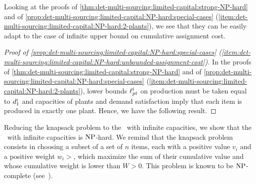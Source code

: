 Looking at the proofs of \cref{thm:det-multi-sourcing:limited-capital:strong-NP-hard} and of \cref{prop:det-multi-sourcing:limited-capital:NP-hard:special-cases} (\cref{item:det-multi-sourcing:limited-capital:NP-hard:2-plants}), we see that they can be easily adapt to the case of infinite upper bound on cumulative assignment cost.



\begin{proof}[Proof of \cref{prop:det-multi-sourcing:limited-capital:NP-hard:special-cases} (\cref{item:det-multi-sourcing:limited-capital:NP-hard:unbounded-assignment-cost})]
In the proofs of \cref{thm:det-multi-sourcing:limited-capital:strong-NP-hard} and of \cref{prop:det-multi-sourcing:limited-capital:NP-hard:special-cases} (\cref{item:det-multi-sourcing:limited-capital:NP-hard:2-plants}), lower bounds $\ell_{pt}^i$ on production must be taken equal to $d_1^i$ and capacities of plants and demand satisfaction imply that each item is produced in exactly one plant.
Hence, we have the following result.
\end{proof}







Reducing the knapsack problem to the \tbc\ with infinite capacities, we show that the \tbc\ with infinite capacities is $\operatorname{NP}$-hard.
We remind that the knapsack problem consists in choosing a subset of a set of $n$ items, each with a positive value $v_i$ and a positive weight $w_i>$, which maximize the sum of their cumulative value and whose cumulative weight is lower than $W>0$.
This problem is known to be $\operatorname{NP}$-complete (see~\cite{Garey1979}).


